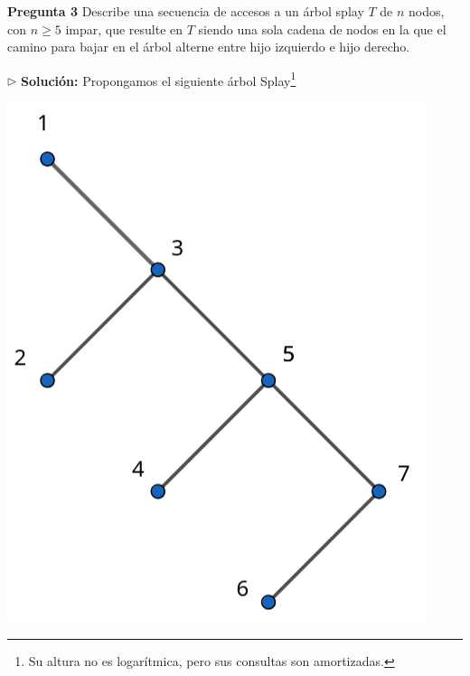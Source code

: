 \textbf{Pregunta 3}
Describe una secuencia de accesos a un árbol splay $T$ de $n$ nodos, con $n \geq 5$ impar, que resulte en $T$
siendo una sola cadena de nodos en la que el camino para bajar en el árbol alterne entre hijo izquierdo e hijo derecho.
\newline

$\rhd$ \textbf{Solución:} Propongamos el siguiente árbol Splay\footnote{Su altura no es logarítmica,
pero sus consultas son amortizadas.}

\begin{center}
  \includegraphics[scale=0.4]{./01.png}
\end{center}

